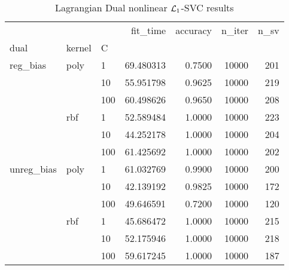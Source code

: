 \begin{table}[H]
\centering
\caption{Lagrangian Dual nonlinear $\protect \mathcal{L}_1$-SVC results}
\label{nonlinear_lagrangian_dual_l1_svc_cv_results}
\begin{tabular}{lllrrrr}
\toprule
           &     &     &   fit\_time &  accuracy &  n\_iter &  n\_sv \\
dual & kernel & C &            &           &         &       \\
\midrule
reg\_bias & poly & 1   &  69.480313 &    0.7500 &   10000 &   201 \\
           &     & 10  &  55.951798 &    0.9625 &   10000 &   219 \\
           &     & 100 &  60.498626 &    0.9650 &   10000 &   208 \\
           & rbf & 1   &  52.589484 &    1.0000 &   10000 &   223 \\
           &     & 10  &  44.252178 &    1.0000 &   10000 &   204 \\
           &     & 100 &  61.425692 &    1.0000 &   10000 &   202 \\
unreg\_bias & poly & 1   &  61.032769 &    0.9900 &   10000 &   200 \\
           &     & 10  &  42.139192 &    0.9825 &   10000 &   172 \\
           &     & 100 &  49.646591 &    0.7200 &   10000 &   120 \\
           & rbf & 1   &  45.686472 &    1.0000 &   10000 &   215 \\
           &     & 10  &  52.175946 &    1.0000 &   10000 &   218 \\
           &     & 100 &  59.617245 &    1.0000 &   10000 &   187 \\
\bottomrule
\end{tabular}
\end{table}
